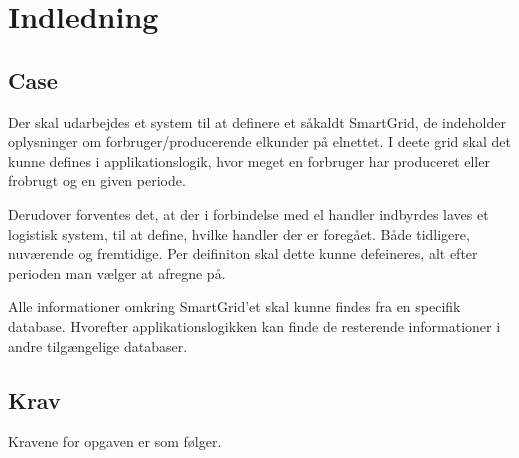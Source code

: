 
\section{Indledning}



\subsection{Case}

Der skal udarbejdes et system til at definere et såkaldt SmartGrid, de indeholder oplysninger om forbruger/producerende elkunder på elnettet. I deete grid skal det kunne defines i applikationslogik, hvor meget en forbruger har produceret eller frobrugt og en given periode.

Derudover forventes det, at der i forbindelse med el handler indbyrdes laves et logistisk system, til at define, hvilke handler der er foregået. Både tidligere, nuværende og fremtidige. Per deifiniton skal dette kunne defeineres, alt efter perioden man vælger at afregne på.

Alle informationer omkring SmartGrid'et skal kunne findes fra en specifik database. Hvorefter applikationslogikken kan finde de resterende informationer i andre tilgængelige databaser.


\subsection{Krav}

Kravene for opgaven er som følger.

